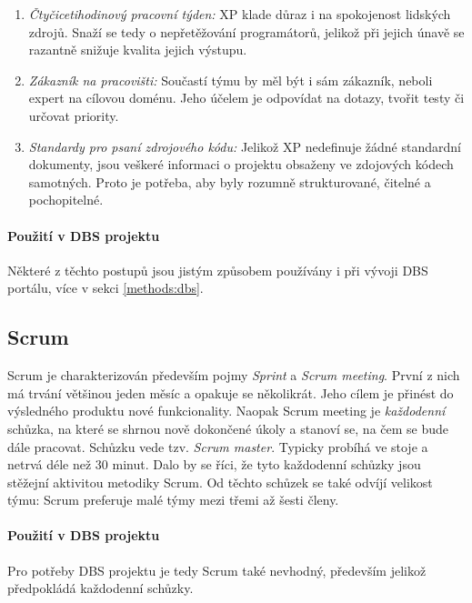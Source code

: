 \begin{enumerate}
	\item \emph{Čtyčicetihodinový pracovní týden:} XP klade důraz i na spokojenost lidských zdrojů. Snaží se tedy o nepřetěžování programátorů, jelikož při jejich únavě se razantně snižuje kvalita jejich výstupu.
	\item \emph{Zákazník na pracovišti:} Součastí týmu by měl být i sám zákazník, neboli expert na cílovou doménu. Jeho účelem je odpovídat na dotazy, tvořit testy či určovat priority.
	\item \emph{Standardy pro psaní zdrojového kódu:} Jelikož XP nedefinuje žádné standardní dokumenty, jsou veškeré informaci o projektu obsaženy ve zdojových kódech samotných. Proto je potřeba, aby byly rozumně strukturované, čitelné a pochopitelné.
\end{enumerate}

\paragraph{Použití v DBS projektu}
Některé z těchto postupů jsou jistým způsobem používány i při vývoji DBS portálu, více v sekci \ref{methods:dbs}.


\subsection{Scrum} \label{methods:scrum}

Scrum je charakterizován především pojmy \emph{Sprint} a \emph{Scrum meeting}. První z nich má trvání většinou jeden měsíc a opakuje se několikrát. Jeho cílem je přinést do výsledného produktu nové funkcionality. Naopak Scrum meeting je \emph{každodenní} schůzka, na které se shrnou nově dokončené úkoly a stanoví se, na čem se bude dále pracovat. Schůzku vede tzv. \emph{Scrum master}. Typicky probíhá ve stoje a netrvá déle než 30 minut. Dalo by se říci, že tyto každodenní schůzky jsou stěžejní aktivitou metodiky Scrum. Od těchto schůzek se také odvíjí velikost týmu: Scrum preferuje malé týmy mezi třemi až šesti členy.

\paragraph{Použití v DBS projektu}
Pro potřeby DBS projektu je tedy Scrum také nevhodný, především jelikož předpokládá každodenní schůzky.


